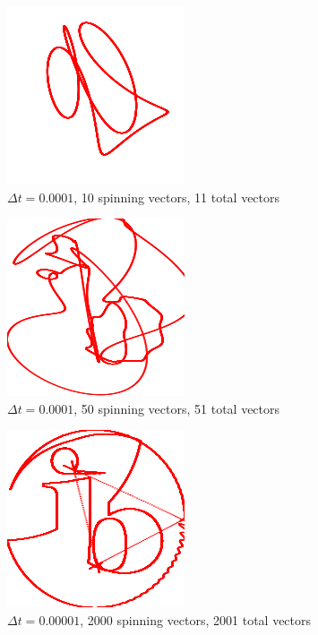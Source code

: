 \documentclass[letterpaper, 12pt]{article}
\begin{document}
\begin{figure}[H]
    \centering
    \includegraphics[width=.5\textwidth]{5.png}
    \caption{\protect\(\Delta t = 0.0001\), 10 spinning vectors, 11 total vectors}
\end{figure}

\begin{figure}[H]
    \centering
    \includegraphics[width=.5\textwidth]{25.png}
    \caption{\protect\(\Delta t = 0.0001\), 50 spinning vectors, 51 total vectors}
\end{figure}

\begin{figure}[H]
    \centering
    \includegraphics[width=.5\textwidth]{1000.png}
    \caption{\protect\(\Delta t = 0.00001\), 2000 spinning vectors, 2001 total vectors}
\end{figure}
\end{document}
